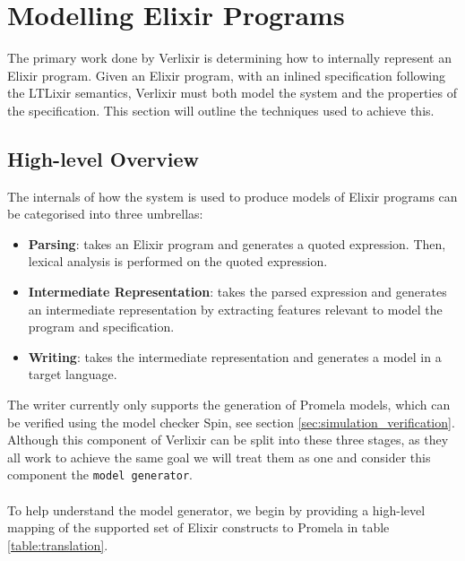 \section{Modelling Elixir Programs} \label{sec:modelling_elixir_programs}
The primary work done by Verlixir is determining how to internally represent an Elixir program. Given an Elixir program, with an inlined specification following the LTLixir semantics, Verlixir must both model the system and the properties of the specification. This section will outline the techniques used to achieve this.
\subsection{High-level Overview}
The internals of how the system is used to produce models of Elixir programs can be categorised into three umbrellas:
\begin{itemize}
    \item \textbf{Parsing}: takes an Elixir program and generates a quoted expression. Then, lexical analysis is performed on the quoted expression.
    \item \textbf{Intermediate Representation}: takes the parsed expression and generates an intermediate representation by extracting features relevant to model the program and specification.
    \item \textbf{Writing}: takes the intermediate representation and generates a model in a target language.
\end{itemize} 
The writer currently only supports the generation of Promela models, which can be verified using the model checker Spin, see section \ref{sec:simulation_verification}. Although this component of Verlixir can be split into these three stages, as they all work to achieve the same goal we will treat them as one and consider this component the \texttt{model generator}. 
\\ \\
To help understand the model generator, we begin by providing a high-level mapping of the supported set of Elixir constructs to Promela in table \ref{table:translation}.
\\ \\

